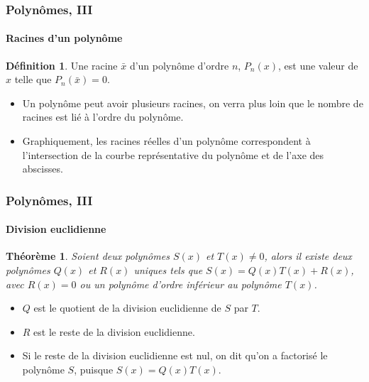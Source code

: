 \documentclass[10pt,notheorems]{beamer}
\theoremstyle{plain}
\newtheorem{theorem}{Théorème}
\theoremstyle{definition} %
\newtheorem{definition}{Définition}
\begin{document}
\begin{frame}
  \frametitle{Polynômes, III}
  \framesubtitle{Racines d'un polynôme}
  \hypertarget{slide_polynome_racines_1}{}

  \bigskip

  \begin{definition}
    Une racine $\bar x$ d'un polynôme d'ordre $n$, $P_n(x)$, est une
    valeur de $x$ telle que $P_n(\bar x)=0$.
  \end{definition}

  \bigskip

  \begin{itemize}

  \item Un polynôme peut avoir plusieurs racines, on verra plus loin que le nombre de racines est lié à l'ordre du polynôme.\newline

  \item Graphiquement, les racines réelles d'un polynôme correspondent à l'intersection de la courbe représentative du polynôme et de l'axe des abscisses.

  \end{itemize}

\end{frame}


\begin{frame}
  \frametitle{Polynômes, III}
  \framesubtitle{Division euclidienne}
  \hypertarget{slide_division_1}{}

  \bigskip

  \begin{theorem}
    Soient deux polynômes $S(x)$ et $T(x)\neq 0$, alors il existe deux polynômes $Q(x)$ et $R(x)$ uniques tels que $S(x) = Q(x)T(x)+R(x)$, avec $R(x)=0$ ou un polynôme d'ordre inférieur au polynôme $T(x)$.
  \end{theorem}

  \bigskip

  \begin{itemize}

  \item $Q$ est le quotient de la division euclidienne de $S$ par $T$.\newline

  \item $R$ est le reste de la division euclidienne.\newline

  \item Si le reste de la division euclidienne est nul, on dit qu'on a factorisé le polynôme $S$, puisque $S(x)=Q(x)T(x)$.

  \end{itemize}

\end{frame}
\end{document}
